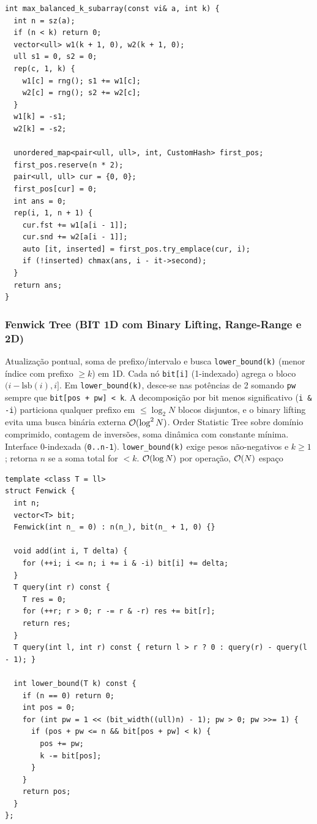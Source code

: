 \begin{lstlisting}
int max_balanced_k_subarray(const vi& a, int k) {
  int n = sz(a);
  if (n < k) return 0;
  vector<ull> w1(k + 1, 0), w2(k + 1, 0);
  ull s1 = 0, s2 = 0;
  rep(c, 1, k) {
    w1[c] = rng(); s1 += w1[c];
    w2[c] = rng(); s2 += w2[c];
  }
  w1[k] = -s1;
  w2[k] = -s2;

  unordered_map<pair<ull, ull>, int, CustomHash> first_pos;
  first_pos.reserve(n * 2);
  pair<ull, ull> cur = {0, 0};
  first_pos[cur] = 0;
  int ans = 0;
  rep(i, 1, n + 1) {
    cur.fst += w1[a[i - 1]];
    cur.snd += w2[a[i - 1]];
    auto [it, inserted] = first_pos.try_emplace(cur, i);
    if (!inserted) chmax(ans, i - it->second);
  }
  return ans;
}
\end{lstlisting}

\subsubsection{Fenwick Tree (BIT 1D com Binary Lifting, Range-Range e 2D)}
\algobox
  {Atualização pontual, soma de prefixo/intervalo e busca \texttt{lower\_bound(k)} (menor índice com prefixo $\ge k$) em 1D.}
  {Cada nó \texttt{bit[i]} (1-indexado) agrega o bloco $(i - \text{lsb}(i), i]$. Em \texttt{lower\_bound(k)}, desce-se nas potências de 2 somando \texttt{pw} sempre que \texttt{bit[pos + pw] < k}.}
  {A decomposição por bit menos significativo (\texttt{i \& -i}) particiona qualquer prefixo em $\le \log_2 N$ blocos disjuntos, e o binary lifting evita uma busca binária externa $\mathcal{O}(\log^2 N)$.}
  {Order Statistic Tree sobre domínio comprimido, contagem de inversões, soma dinâmica com constante mínima.}
  {Interface 0-indexada (\texttt{0..n-1}). \texttt{lower\_bound(k)} exige pesos não-negativos e $k \ge 1$; retorna $n$ se a soma total for $< k$.}
  {$\mathcal{O}(\log N)$ por operação, $\mathcal{O}(N)$ espaço}

\begin{lstlisting}
template <class T = ll>
struct Fenwick {
  int n;
  vector<T> bit;
  Fenwick(int n_ = 0) : n(n_), bit(n_ + 1, 0) {}

  void add(int i, T delta) {
    for (++i; i <= n; i += i & -i) bit[i] += delta;
  }
  T query(int r) const {
    T res = 0;
    for (++r; r > 0; r -= r & -r) res += bit[r];
    return res;
  }
  T query(int l, int r) const { return l > r ? 0 : query(r) - query(l - 1); }

  int lower_bound(T k) const {
    if (n == 0) return 0;
    int pos = 0;
    for (int pw = 1 << (bit_width((ull)n) - 1); pw > 0; pw >>= 1) {
      if (pos + pw <= n && bit[pos + pw] < k) {
        pos += pw;
        k -= bit[pos];
      }
    }
    return pos;
  }
};
\end{lstlisting}

